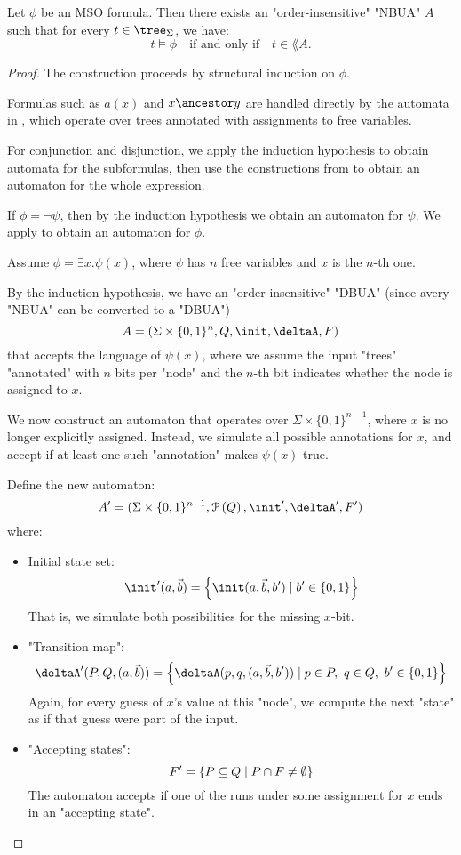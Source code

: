 \documentclass[a4paper,UKenglish,cleveref, autoref, thm-restate]{lipics-v2021}
\begin{document}
\begin{lemma}\label{lem:MSO-to-aut}
	Let $\phi$ be an MSO formula. Then there exists an "order-insensitive" "NBUA" $A$ such that for every $t \in \tree_\Sigma$, we have:
	\[
		t \models \phi \quad \text{if and only if} \quad t \in \lang{A}.
	\]
\end{lemma}

\begin{proof}
	The construction proceeds by structural induction on $\phi$.

	Formulas such as $a(x)$ and $x \ancestor y$ are handled directly by the automata
	in , which operate over trees annotated with assignments to free variables.

	For conjunction and disjunction, we apply the induction hypothesis to obtain automata
	for the subformulas, then use the constructions from  to obtain an automaton for the whole expression.

	If $\phi = \lnot \psi$, then by the induction hypothesis we obtain an automaton for $\psi$. We apply
	 to obtain an automaton for $\phi$.

	Assume $\phi = \exists x.\psi(x)$, where $\psi$ has $n$ free variables and $x$ is the $n$-th one.

	By the induction hypothesis, we have an "order-insensitive" "DBUA" (since avery "NBUA" can be converted to a "DBUA")
	\[
		A = (\Sigma \times \{0,1\}^n, Q, \init, \deltaA, F)
	\]
	that accepts the language of $\psi(x)$, where we assume the input "trees" "annotated" with $n$ bits per "node" and the $n$-th bit indicates
	whether the node is assigned to $x$.

	We now construct an automaton that operates over $\Sigma \times \{0,1\}^{n-1}$, where $x$ is no longer explicitly assigned.
	Instead, we simulate all possible annotations for $x$, and accept if at least one such "annotation" makes $\psi(x)$ true.

	Define the new automaton:
	\[
		A' = (\Sigma \times \{0,1\}^{n-1}, \parts Q, \init', \deltaA', F')
	\]
	where:
	\begin{itemize}
		\item Initial state set:
		      \[
			      \init'(a, \vec{b}) = \setdef{ \init(a, \vec{b}, b')} {b' \in \{0,1\} }
		      \]
		      That is, we simulate both possibilities for the missing $x$-bit.
		\item "Transition map":
		      \[
			      \deltaA'(P, Q, (a, \vec{b})) = \setdef{ \deltaA(p, q, (a, \vec{b}, b'))} {p \in P,\ q \in Q,\ b' \in \{0,1\} }
		      \]
		      Again, for every guess of $x$’s value at this "node", we compute the next "state" as if that guess were part of the input.
		\item "Accepting states":
		      \[
			      F' = \left\{ P \subseteq Q \mid P \cap F \neq \emptyset \right\}
		      \]
		      The automaton accepts if one of the runs under some assignment for $x$ ends in an "accepting state".
	\end{itemize}


\end{proof}
\end{document}
